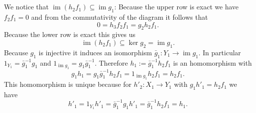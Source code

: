 \documentclass[a4paper,10pt]{article}
\theoremstyle{definition}
\newcommand{\img}{\operatorname{im}}
\begin{document}
\section{}
We notice that $\img(h_2 f_1) \subseteq \img g_1$: Because the upper row is exact we have $f_2 f_1 = 0$ and from the commutativity of the diagram it follows that
\[
 0 = h_3 f_2 f_1 =  g_2 h_2 f_1.
\]
Because the lower row is exact this gives us
\[
 \img(h_2 f_1) \subseteq \ker g_2 = \img g_1.
\]
Because $g_1$ is injective it induces an isomorphism $\bar{g}_1 : Y_1 \rightarrow \img g_1$. In particular $1_{Y_1} = \bar{g}_1^{-1} g_1$ and $1_{\img g_1} = g_1 \bar{g}_1^{-1}$. Therefore $h_1 := \bar{g}_1^{-1} h_2 f_1$ is an homomorphism with
\[
 g_1 h_1 = g_1 \bar{g}_1^{-1} h_2 f_1 = 1_{\img g_1} h_2 f_1 = h_2 f_1.
\]
This homomorphism is unique because for $h'_2 : X_1 \rightarrow Y_1$ with $g_1 h'_1 = h_2 f_1$ we have
\[
 h'_1 = 1_{Y_1} h'_1 = \bar{g}_1^{-1} g_1 h'_1 = \bar{g}^{-1}_1 h_2 f_1 = h_1.
\]
\end{document}
